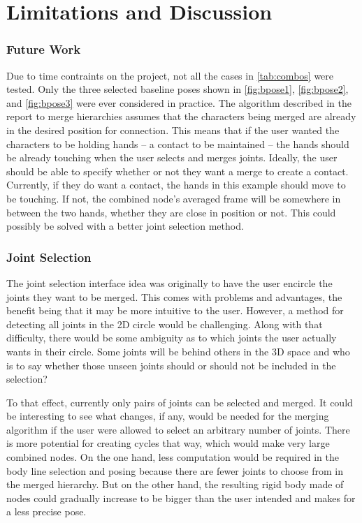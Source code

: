 \chapter{Limitations and Discussion}\label{chap:discussion}
\subsection{Future Work}
Due to time contraints on the project, not all the cases in \autoref{tab:combos} were tested. Only the three selected baseline poses shown in \autoref{fig:bpose1}, \autoref{fig:bpose2}, and \autoref{fig:bpose3} were ever considered in practice. The algorithm described in the report to merge hierarchies assumes that the characters being merged are already in the desired position for connection. This means that if the user wanted the characters to be holding hands -- a contact to be maintained -- the hands should be already touching when the user selects and merges joints. Ideally, the user should be able to specify whether or not they want a merge to create a contact. Currently, if they do want a contact, the hands in this example should move to be touching. If not, the combined node's averaged frame will be somewhere in between the two hands, whether they are close in position or not. This could possibly be solved with a better joint selection method.

\subsection{Joint Selection}
The joint selection interface idea was originally to have the user encircle the joints they want to be merged. This comes with problems and advantages, the benefit being that it may be more intuitive to the user. However, a method for detecting all joints in the 2D circle would be challenging. Along with that difficulty, there would be some ambiguity as to which joints the user actually wants in their circle. Some joints will be behind others in the 3D space and who is to say whether those unseen joints should or should not be included in the selection?

To that effect, currently only pairs of joints can be selected and merged. It could be interesting to see what changes, if any, would be needed for the merging algorithm if the user were allowed to select an arbitrary number of joints. There is more potential for creating cycles that way, which would make very large combined nodes. On the one hand, less computation would be required in the body line selection and posing because there are fewer joints to choose from in the merged hierarchy. But on the other hand, the resulting rigid body made of nodes could gradually increase to be bigger than the user intended and makes for a less precise pose.


